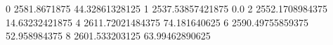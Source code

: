 0 2581.8671875 44.32861328125
1 2537.53857421875 0.0
2 2552.1708984375 14.63232421875
4 2611.72021484375 74.181640625
6 2590.49755859375 52.958984375
8 2601.533203125 63.99462890625
